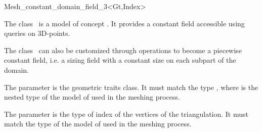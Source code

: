 \ccRefPageBegin


\begin{ccRefFunctionObjectClass}{Mesh_constant_domain_field_3<Gt,Index>}  %


\ccDefinition
  
The class \ccRefName\ is a model of concept . It provides
a constant field accessible using queries on 3D-points.

The class \ccRefName\ can also be customized through  operations to become
a piecewise constant field, i.e. a sizing field with a constant size on each subpart
of the domain.



\ccParameters

The parameter  is the geometric traits class. It must match the type ,
where  is the nested type of the model of  used
in the meshing process.

The parameter  is the type of index of the vertices of the triangulation.
It must match the type  of the model of  used in the meshing process.

\ccIsModel


\ccTypes

\ccGlue
{}

\ccCreation
{}  %


\ccOperations
{}


\ccSeeAlso

 \\

\end{ccRefFunctionObjectClass}

\ccRefPageEnd

